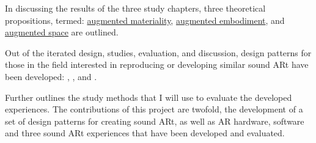     In discussing the results of the three study chapters, three theoretical propositions, termed: \hyperref[sec: discussion-medium-material]{augmented materiality}, \hyperref[sec: discussion-medium-embodiment]{augmented embodiment}, and \hyperref[sec: discussion-medium-space]{augmented space} are outlined.
    
    Out of the iterated design, studies, evaluation, and discussion, design patterns for those in the field interested in reproducing or developing similar sound ARt have been developed: \textit{}, \textit{}, and \textit{}. 
    
    Further outlines the study methods that I will use to evaluate the developed experiences. The contributions of this project are twofold, the development of a set of design patterns for creating sound ARt, as well as AR hardware, software and three sound ARt experiences that have been developed and evaluated.